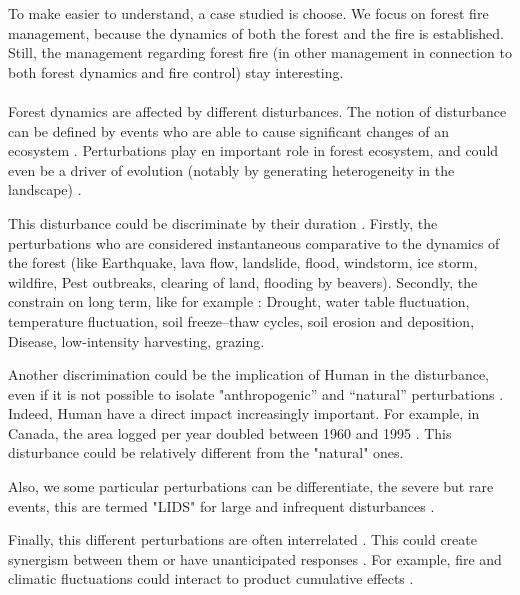 \documentclass{article}
\begin{document}
To make easier to understand, a case studied is choose. We focus on forest fire management, because the dynamics of both the forest and the fire is established. Still, the management regarding forest fire (in other management in connection to both forest dynamics and fire control) stay interesting.



\paragraph{}

Forest dynamics are affected by different disturbances. The notion of disturbance can be defined by events who are able to cause significant changes of an ecosystem \cite{white1985natural} \cite{rykiel1985towards}. Perturbations play en important role in forest ecosystem, and could even be a driver of evolution (notably by generating heterogeneity in the landscape) \cite{turner2010disturbance}.

This disturbance could be discriminate by their duration \cite{perera2015simulation}. Firstly, the perturbations who are considered instantaneous comparative to the dynamics of the forest (like Earthquake, lava flow, landslide, flood, windstorm, ice storm, wildfire, Pest outbreaks, clearing of land, flooding by beavers). Secondly, the constrain on long term, like for example : Drought, water table fluctuation, temperature fluctuation, soil freeze–thaw cycles, soil erosion and deposition, Disease, low-intensity harvesting, grazing.

Another discrimination could be the implication of Human in the disturbance, even if it is not possible to isolate "anthropogenic” and “natural” perturbations \cite{perera2015simulation}.
Indeed, Human have a direct impact increasingly important. For example, in Canada, the area logged per year doubled between 1960 and  1995 \cite{smith_canadas_2000}. This disturbance could be relatively different from the "natural" ones.

Also, we some particular perturbations can be differentiate, the severe but rare events, this are termed "LIDS" for large and infrequent disturbances \cite{foster1998landscape}.

Finally, this different perturbations are often interrelated \cite{keane2015exploring}. This could create synergism between them \cite{mandre_environmental_2011} or have  unanticipated responses \cite{perera2015simulation}. For example, fire and climatic fluctuations could interact to product cumulative effects \cite{romme2009historical}.
\end{document}
